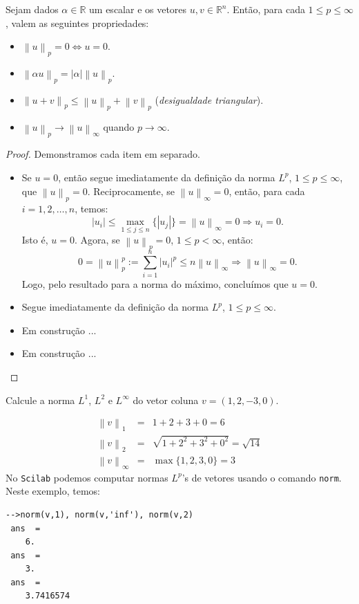 \begin{prop}
  Sejam dados $\alpha\in\mathbb{R}$ um escalar e os vetores $u,v\in\mathbb{R}^n$. Então, para cada $1\leq p \leq \infty$, valem as seguintes propriedades:
  \begin{itemize}
  \item[a)] $\left\|u\right\|_p = 0 \Leftrightarrow u = 0$.
  \item[b)] $\left\|\alpha u\right\|_p = |\alpha|\left\|u\right\|_p$.
  \item[c)] $\left\|u + v\right\|_p \leq \left\|u\right\|_p + \left\|v\right\|_p$ (\emph{desigualdade triangular}).
  \item[d)] $\left\|u\right\|_p\to\left\|u\right\|_\infty$ quando $p\to\infty$.
  \end{itemize}
\end{prop}
\begin{proof} Demonstramos cada item em separado.
  \begin{itemize}
  \item[a)] Se $u = 0$, então segue imediatamente da definição da norma $L^p$, $1\leq p \leq \infty$, que $\left\|u\right\|_p = 0$. Reciprocamente, se  $\left\|u\right\|_\infty = 0$, então, para cada $i=1, 2, \ldots, n$, temos:
    \begin{equation}
      \left|u_i\right| \leq \max_{1\leq j \leq n}\{|u_j|\} = \left\|u\right\|_{\infty} = 0\Rightarrow u_i = 0.
    \end{equation}
Isto é, $u = 0$. Agora, se $\left\|u\right\|_p = 0$, $1\leq p < \infty$, então:
\begin{equation}
  0 = \left\|u\right\|_p^p := \sum_{i=1}^n \left|u_i\right|^p \leq n\left\|u\right\|_\infty \Rightarrow  \left\|u\right\|_\infty = 0.
\end{equation}
Logo, pelo resultado para a norma do máximo, concluímos que $u=0$.
\item[b)] Segue imediatamente da definição da norma $L^p$, $1\leq p \leq \infty$.
\item[c)] Em construção ...
\item[d)] Em construção ...
\end{itemize}
\end{proof}

\begin{ex}
  Calcule a norma $L^1$, $L^2$ e $L^\infty$ do vetor coluna $v = (1, 2, -3, 0)$.
\end{ex}
\begin{sol}
  \begin{eqnarray}
    \left\|v\right\|_1 &=& 1+2+3+0=6\\
    \left\|v\right\|_2 &=& \sqrt{1+2^2+3^2+0^2}=\sqrt{14}\\
    \left\|v\right\|_\infty &=& \max\{1,2,3,0\}=3
  \end{eqnarray}
\ifisscilab
No \verb+Scilab+ podemos computar normas $L^p$'s de vetores usando o comando \verb+norm+. Neste exemplo, temos:
\begin{verbatim}
-->norm(v,1), norm(v,'inf'), norm(v,2)
 ans  =
    6.
 ans  =
    3.
 ans  =
    3.7416574
\end{verbatim}
\fi
\end{sol}


